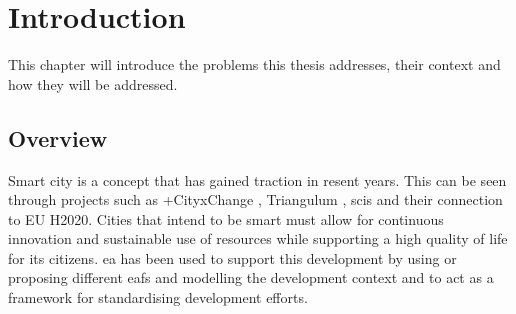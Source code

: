 \chapter{Introduction}
\label{chap:introduction}
\iffalse %
Over the years, several thesis templates for \LaTeX{} have been developed by different groups at NTNU. Typically, there have been local templates for given study programmes, or different templates for the different study levels – bachelor, master, and \acrshort{phd}.\footnote{see, e.g., \url{https://github.com/COPCSE-NTNU/bachelor-thesis-NTNU} and \url{https://github.com/COPCSE-NTNU/master-theses-NTNU}}

Based on this experience, the \acrfull{CoPCSE}\footnote{\url{https://www.ntnu.no/wiki/display/copcse/Community+of+Practice+in+Computer+Science+Education+Home}} is hereby offering a template that should in principle be applicable for theses at all study levels. It is closely based on the standard \LaTeX{} \texttt{report} document class as well as previous thesis templates. Since the central regulations for thesis design have been relaxed – at least for some of the historical university colleges now part of NTNU – the template has been simlified and put closer to the default \LaTeX{} look and feel.

The purpose of the present document is threefold. It should serve (i) as a description of the document class, (ii) as an example of how to use it, and (iii) as a thesis template.
\fi     %

This chapter will introduce the problems this thesis addresses, their context and how they will be addressed. 

\section{Overview}
Smart city is a concept that has gained traction in resent years. This can be seen through projects such as +CityxChange \cite{cityxchange}, Triangulum \cite{triangulum}, \gls{scis} and their connection to EU H2020. Cities that intend to be smart must allow for continuous innovation and sustainable use of resources while supporting a high quality of life for its citizens. \gls{ea} has been used to support this \cite{kakarontzas2014, gobin2020systematic, bastidas2017cities} development by using or proposing different \glspl{eaf} and modelling the development context and to act as a framework for standardising development efforts. 

